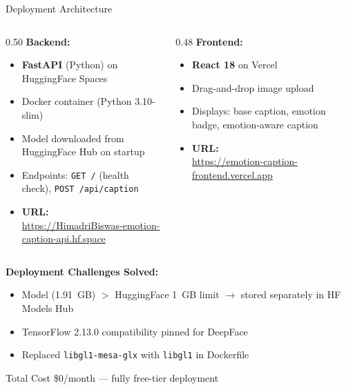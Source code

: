 \documentclass{beamer}
\begin{document}
\begin{frame}{Deployment Architecture}

    \begin{columns}[T]
    \begin{column}{0.50\textwidth}
        \textbf{Backend:}
        \begin{itemize}
            \item \textbf{FastAPI} (Python) on HuggingFace Spaces
            \item Docker container (Python 3.10-slim)
            \item Model downloaded from HuggingFace Hub on startup
            \item Endpoints: \texttt{GET /} (health check), \texttt{POST /api/caption}
            \item \textbf{URL:}\\
                  \tiny\url{https://HimadriBiswas-emotion-caption-api.hf.space}
        \end{itemize}
    \end{column}
    \begin{column}{0.48\textwidth}
        \textbf{Frontend:}
        \begin{itemize}
            \item \textbf{React 18} on Vercel
            \item Drag-and-drop image upload
            \item Displays: base caption, emotion badge, emotion-aware caption
            \item \textbf{URL:}\\
                  \tiny\url{https://emotion-caption-frontend.vercel.app}
        \end{itemize}
    \end{column}
    \end{columns}

    \vspace{0.4cm}
    \textbf{Deployment Challenges Solved:}
    \begin{itemize}
        \item Model (1.91~GB) $>$ HuggingFace 1~GB limit $\to$ stored separately in HF Models Hub
        \item TensorFlow 2.13.0 compatibility pinned for DeepFace
        \item Replaced \texttt{libgl1-mesa-glx} with \texttt{libgl1} in Dockerfile
    \end{itemize}

    \vspace{0.2cm}
    \begin{block}{Total Cost}
        \centering \$0/month — fully free-tier deployment
    \end{block}

\end{frame}
\end{document}
